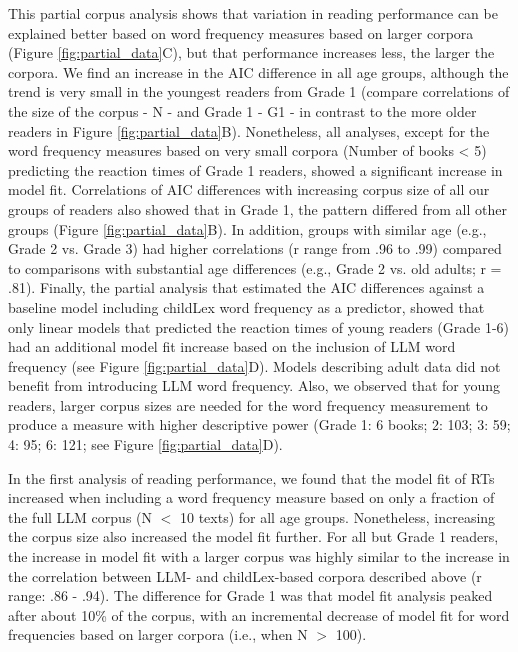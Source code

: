 \documentclass[manuscript]{stjour}
\begin{document}
This partial corpus analysis shows that variation in reading performance can be explained better based on word frequency measures based on larger corpora (Figure \ref{fig:partial_data}C), but that performance increases less, the larger the corpora. We find an increase in the AIC difference in all age groups, although the trend is very small in the youngest readers from Grade 1 (compare correlations of the size of the corpus - N - and Grade 1 - G1 - in contrast to the more older readers in Figure \ref{fig:partial_data}B). Nonetheless, all analyses, except for the word frequency measures based on very small corpora (Number of books < 5) predicting the reaction times of Grade 1 readers, showed a significant increase in model fit. Correlations of AIC differences with increasing corpus size of all our groups of readers also showed that in Grade 1, the pattern differed from all other groups (Figure \ref{fig:partial_data}B). In addition, groups with similar age (e.g., Grade 2 vs. Grade 3) had higher correlations (r range from .96 to .99) compared to comparisons with substantial age differences (e.g., Grade 2 vs. old adults; r = .81). Finally, the partial analysis that estimated the AIC differences against a baseline model including childLex word frequency as a predictor, showed that only linear models that predicted the reaction times of young readers (Grade 1-6) had an additional model fit increase based on the inclusion of LLM word frequency (see Figure \ref{fig:partial_data}D). Models describing adult data did not benefit from introducing LLM word frequency. Also, we observed that for young readers, larger corpus sizes are needed for the word frequency measurement to produce a measure with higher descriptive power (Grade 1: 6 books; 2: 103; 3: 59; 4: 95; 6: 121; see Figure \ref{fig:partial_data}D).


In the first analysis of reading performance, we found that the model fit of RTs increased when including a word frequency measure based on only a fraction of the full LLM corpus (N $<$ 10 texts) for all age groups. Nonetheless, increasing the corpus size also increased the model fit further. For all but Grade 1 readers, the increase in model fit with a larger corpus was highly similar to the increase in the correlation between LLM- and childLex-based corpora described above (r range: .86 - .94). The difference for Grade 1 was that model fit analysis peaked after about 10\% of the corpus, with an incremental decrease of model fit for word frequencies based on larger corpora (i.e., when N $>$ 100). 
\end{document}
